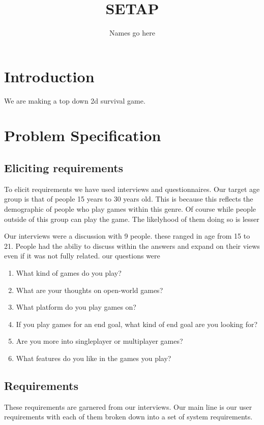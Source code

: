 \documentclass{article}
\title{SETAP}
\author{Names go here}
\begin{document}
\maketitle
\tableofcontents
\newpage
\section{Introduction}%
\label{sec:intro}
We are making a top down 2d survival game.

\section{Problem Specification}%
\label{sec:problem}
\subsection{Eliciting requirements}%
\label{subsec:reqs}
To elicit requirements we have used interviews and questionnaires. Our target age group is that of
people 15 years to 30 years old. This is because this reflects the demographic
of people who play games within this genre. Of course while people outside of
this group can play the game. The likelyhood of them doing so is lesser

Our interviews were a discussion with 9 people. these ranged in age from 15 to
21. People had the abiliy to discuss within the answers and expand on their
views even if it was not fully related.
our questions were
\begin{enumerate}
	\item What kind of games do you play?
	\item What are your thoughts on open-world games?
	\item What platform do you play games on?
	\item If you play games for an end goal, what kind of end goal are you looking for?
	\item Are you more into singleplayer or multiplayer games?
	\item What features do you like in the games you play?
\end{enumerate}

\subsection{Requirements}%
\label{subsec:ureqs}
These requirements are garnered from our interviews. Our main line is our user
requirements with each of them broken down into a set of system requirements.
\end{document}
